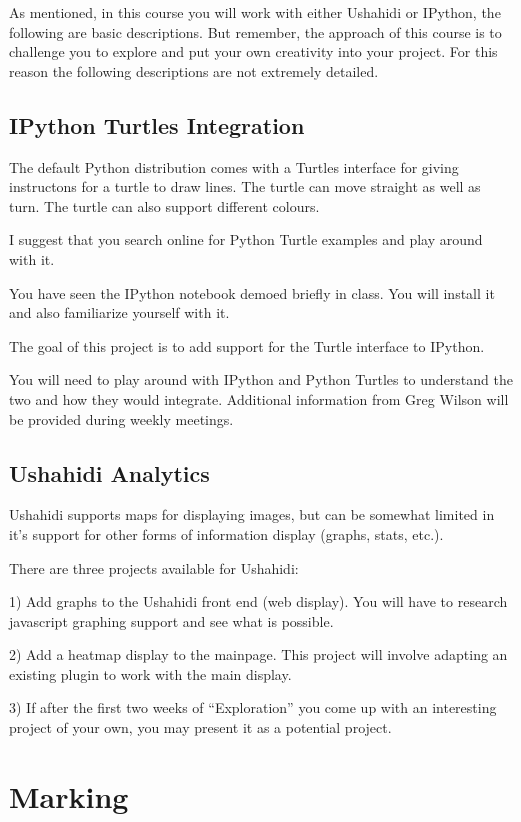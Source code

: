 \documentclass[letterpaper]{article}
\begin{document}
As mentioned, in this course you will work with either Ushahidi or IPython,
the following are basic descriptions.  But remember, the approach of this
course is to challenge you to explore and put your own creativity into your
project.  For this reason the following descriptions are not extremely
detailed.

\subsection*{IPython Turtles Integration}

The default Python distribution comes with a Turtles interface for giving
instructons for a turtle to draw lines.  The turtle can move straight as well
as turn.  The turtle can also support different colours.

I suggest that you search online for Python Turtle examples and play around with it.

You have seen the IPython notebook demoed briefly in class.  You will install
it and also familiarize yourself with it.

The goal of this project is to add support for the Turtle interface to IPython.

You will need to play around with IPython and Python Turtles to understand the two
and how they would integrate.  Additional information from Greg Wilson will be provided during weekly meetings.

\subsection*{Ushahidi Analytics}

Ushahidi supports maps for displaying images, but can be somewhat limited in
it's support for other forms of information display (graphs, stats, etc.).

There are three projects available for Ushahidi:

1)  Add graphs to the Ushahidi front end (web display).  You will have to
research javascript graphing support and see what is possible.

2)  Add a heatmap display to the mainpage.  This project will involve adapting
an existing plugin to work with the main display.

3)  If after the first two weeks of ``Exploration'' you come up with an
interesting project of your own, you may present it as a potential project.

\section*{Marking}
\end{document}
